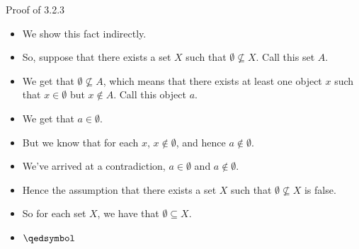 \begin{frame}{Proof of 3.2.3}

	\begin{itemize}

		\item We show this fact indirectly. 
		
		\item So, suppose that there exists a set $X$ such that $\emptyset\nsubseteq X$. Call this set $A$. 
		
		\item We get that $\emptyset\nsubseteq A$, which means that there exists at least one object $x$ such that $x\in \emptyset$ but $x\notin A$. Call this object $a$. 
		
		\item We get that $a\in \emptyset$. 
		
		\item But we know that for each $x$, $x\notin \emptyset$, and hence $a\notin \emptyset$. 
		
		\item We've arrived at a contradiction, $a\in \emptyset$ and $a\notin\emptyset$. 
		
		\item Hence the assumption that there exists a set $X$ such that $\emptyset\nsubseteq X$ is false.
		
		\item So for each set $X$, we have that $\emptyset\subseteq X$.
		
		\item  $\qedsymbol$


\end{itemize}

\end{frame}

